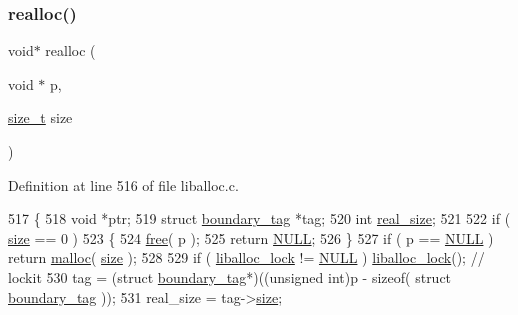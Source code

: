 \subsubsection{\texorpdfstring{realloc()}{realloc()}}
{\footnotesize\ttfamily void$\ast$ realloc (\begin{DoxyParamCaption}\item[{void $\ast$}]{p,  }\item[{\hyperlink{a00026_a7c94ea6f8948649f8d181ae55911eeaf_a7c94ea6f8948649f8d181ae55911eeaf}{size\+\_\+t}}]{size }\end{DoxyParamCaption})}



Definition at line 516 of file liballoc.\+c.


\begin{DoxyCode}
517 \{
518     \textcolor{keywordtype}{void} *ptr;
519     \textcolor{keyword}{struct }\hyperlink{a00095}{boundary\_tag} *tag;
520     \textcolor{keywordtype}{int} \hyperlink{a00095_ad22b1c69bdce419783ac165f7f354245_ad22b1c69bdce419783ac165f7f354245}{real\_size};
521     
522     \textcolor{keywordflow}{if} ( \hyperlink{a00095_a29b056a39f6022d32468e7913e6df936_a29b056a39f6022d32468e7913e6df936}{size} == 0 )
523     \{
524         \hyperlink{a00023_afbedc913aa4651b3c3b4b3aecd9b4711_afbedc913aa4651b3c3b4b3aecd9b4711}{free}( p );
525         \textcolor{keywordflow}{return} \hyperlink{a00026_a070d2ce7b6bb7e5c05602aa8c308d0c4_a070d2ce7b6bb7e5c05602aa8c308d0c4}{NULL};
526     \}
527     \textcolor{keywordflow}{if} ( p == \hyperlink{a00026_a070d2ce7b6bb7e5c05602aa8c308d0c4_a070d2ce7b6bb7e5c05602aa8c308d0c4}{NULL} ) \textcolor{keywordflow}{return} \hyperlink{a00023_a7ac38fce3243a7dcf448301ee9ffd392_a7ac38fce3243a7dcf448301ee9ffd392}{malloc}( \hyperlink{a00095_a29b056a39f6022d32468e7913e6df936_a29b056a39f6022d32468e7913e6df936}{size} );
528 
529     \textcolor{keywordflow}{if} ( \hyperlink{a00026_a8b5670e4594b0b6f8be78fe17f0c3b53_a8b5670e4594b0b6f8be78fe17f0c3b53}{liballoc\_lock} != \hyperlink{a00026_a070d2ce7b6bb7e5c05602aa8c308d0c4_a070d2ce7b6bb7e5c05602aa8c308d0c4}{NULL} ) \hyperlink{a00026_a8b5670e4594b0b6f8be78fe17f0c3b53_a8b5670e4594b0b6f8be78fe17f0c3b53}{liballoc\_lock}();     \textcolor{comment}{// lockit}
530         tag = (\textcolor{keyword}{struct }\hyperlink{a00095}{boundary\_tag}*)((\textcolor{keywordtype}{unsigned} \textcolor{keywordtype}{int})p - \textcolor{keyword}{sizeof}( \textcolor{keyword}{struct }
      \hyperlink{a00095}{boundary\_tag} ));
531         real\_size = tag->\hyperlink{a00095_a29b056a39f6022d32468e7913e6df936_a29b056a39f6022d32468e7913e6df936}{size};

\end{DoxyCode}
